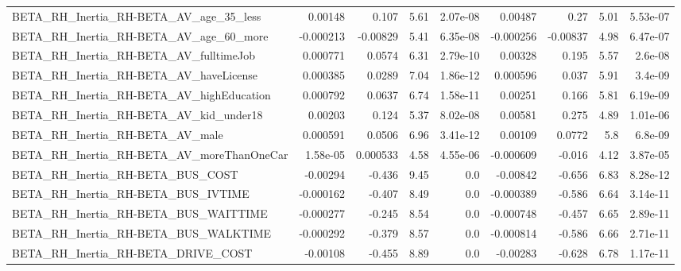 \begin{tabular}{lrrrrrrrr}
BETA\_RH\_Inertia\_RH-BETA\_AV\_age\_35\_less             &     0.00148 &        0.107 &     5.61 & 2.07e-08 &    0.00487 &        0.27 &         5.01 &      5.53e-07 \\
BETA\_RH\_Inertia\_RH-BETA\_AV\_age\_60\_more             &   -0.000213 &     -0.00829 &     5.41 & 6.35e-08 &  -0.000256 &    -0.00837 &         4.98 &      6.47e-07 \\
BETA\_RH\_Inertia\_RH-BETA\_AV\_fulltimeJob             &    0.000771 &       0.0574 &     6.31 & 2.79e-10 &    0.00328 &       0.195 &         5.57 &       2.6e-08 \\
BETA\_RH\_Inertia\_RH-BETA\_AV\_haveLicense             &    0.000385 &       0.0289 &     7.04 & 1.86e-12 &   0.000596 &       0.037 &         5.91 &       3.4e-09 \\
BETA\_RH\_Inertia\_RH-BETA\_AV\_highEducation           &    0.000792 &       0.0637 &     6.74 & 1.58e-11 &    0.00251 &       0.166 &         5.81 &      6.19e-09 \\
BETA\_RH\_Inertia\_RH-BETA\_AV\_kid\_under18             &     0.00203 &        0.124 &     5.37 & 8.02e-08 &    0.00581 &       0.275 &         4.89 &      1.01e-06 \\
BETA\_RH\_Inertia\_RH-BETA\_AV\_male                    &    0.000591 &       0.0506 &     6.96 & 3.41e-12 &    0.00109 &      0.0772 &          5.8 &       6.8e-09 \\
BETA\_RH\_Inertia\_RH-BETA\_AV\_moreThanOneCar          &    1.58e-05 &     0.000533 &     4.58 & 4.55e-06 &  -0.000609 &      -0.016 &         4.12 &      3.87e-05 \\
BETA\_RH\_Inertia\_RH-BETA\_BUS\_COST                   &    -0.00294 &       -0.436 &     9.45 &      0.0 &   -0.00842 &      -0.656 &         6.83 &      8.28e-12 \\
BETA\_RH\_Inertia\_RH-BETA\_BUS\_IVTIME                 &   -0.000162 &       -0.407 &     8.49 &      0.0 &  -0.000389 &      -0.586 &         6.64 &      3.14e-11 \\
BETA\_RH\_Inertia\_RH-BETA\_BUS\_WAITTIME               &   -0.000277 &       -0.245 &     8.54 &      0.0 &  -0.000748 &      -0.457 &         6.65 &      2.89e-11 \\
BETA\_RH\_Inertia\_RH-BETA\_BUS\_WALKTIME               &   -0.000292 &       -0.379 &     8.57 &      0.0 &  -0.000814 &      -0.586 &         6.66 &      2.71e-11 \\
BETA\_RH\_Inertia\_RH-BETA\_DRIVE\_COST                 &    -0.00108 &       -0.455 &     8.89 &      0.0 &   -0.00283 &      -0.628 &         6.78 &      1.17e-11 \\

\end{tabular}
